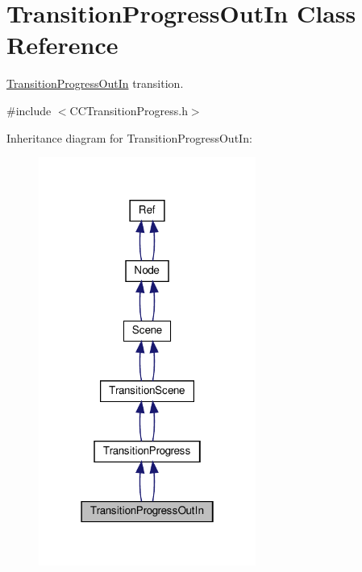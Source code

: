 \hypertarget{classTransitionProgressOutIn}{}\section{Transition\+Progress\+Out\+In Class Reference}
\label{classTransitionProgressOutIn}


\hyperlink{classTransitionProgressOutIn}{Transition\+Progress\+Out\+In} transition.  




{\ttfamily \#include $<$C\+C\+Transition\+Progress.\+h$>$}



Inheritance diagram for Transition\+Progress\+Out\+In\+:
\nopagebreak
\begin{figure}[H]
\begin{center}
\leavevmode
\includegraphics[width=202pt]{classTransitionProgressOutIn__inherit__graph}
\end{center}
\end{figure}


